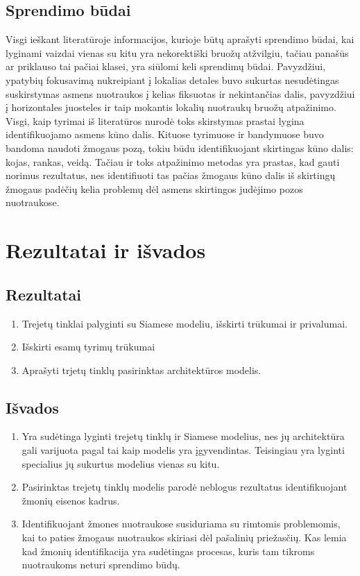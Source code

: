 \documentclass{VUMIFPSkursinis}
\begin{document}
\subsection{Sprendimo būdai}
Visgi ieškant literatūroje informacijos, kurioje būtų aprašyti sprendimo būdai, kai lyginami vaizdai vienas su kitu yra nekorektiški bruožų atžvilgiu, tačiau panašūs ar priklauso tai pačiai klasei, yra siūlomi keli sprendimų būdai. Pavyzdžiui, ypatybių fokusavimą nukreipiant į lokalias detales buvo sukurtas nesudėtingas suskirstymas asmens nuotraukos į kelias fiksuotas ir nekintančias dalis, pavyzdžiui į horizontales juosteles ir taip mokantis lokalių nuotraukų bruožų atpažinimo. Visgi, kaip tyrimai iš literatūros nurodė toks skirstymas prastai lygina identifikuojamo asmens kūno dalis\cite{Person_reindentification}. Kituose tyrimuose ir bandymuose buvo bandoma naudoti žmogaus pozą, tokiu būdu identifikuojant skirtingas kūno dalis: kojas, rankas, veidą. Tačiau ir toks atpažinimo metodas yra prastas, kad gauti norimus rezultatus, nes identifiuoti tas pačias žmogaus kūno dalis iš skirtingų žmogaus padėčių kelia problemų dėl asmens skirtingos judėjimo pozos nuotraukose\cite{Person_reindentification}.
\pagebreak
\section{Rezultatai ir išvados}
\thispagestyle{empty} 
\subsection{Rezultatai}
\begin{enumerate}
\item{Trejetų tinklai palyginti su Siamese modeliu, išskirti trūkumai ir privalumai.}
\item{Išskirti esamų tyrimų trūkumai}
\item{Aprašyti trjetų tinklų pasirinktas architektūros modelis.}
\end{enumerate}
\subsection{Išvados}
\begin{enumerate}
\item{Yra sudėtinga lyginti trejetų tinklų ir Siamese modelius, nes jų architektūra gali varijuota pagal tai kaip modelis yra įgyvendintas. Teisingiau yra lyginti specialius jų sukurtus modelius vienas su kitu.}
\item{Pasirinktas trejetų tinklų modelis parodė neblogus rezultatus identifikuojant žmonių eisenos kadrus.}
\item{Identifikuojant žmones nuotraukose susiduriama su rimtomis problemomis, kai to paties žmogaus nuotraukos skiriasi dėl pašalinių priežasčių. Kas lemia kad žmonių identifikacija yra sudėtingas procesas, kuris tam tikroms nuotraukoms neturi sprendimo būdų.}
\end{enumerate}
\end{document}
